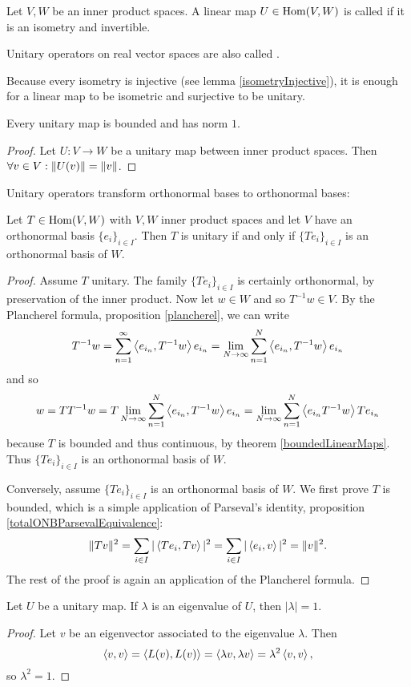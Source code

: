 \begin{definition}
Let $V,W$ be an inner product spaces. A linear map $U\in\operatorname{Hom}(V,W)$ is called  if it is an isometry and invertible.

Unitary operators on real vector spaces are also called .
\end{definition}
Because every isometry is injective (see lemma \ref{isometryInjective}), it is enough for a linear map to be isometric and surjective to be unitary.

\begin{lemma}
Every unitary map is bounded and has norm $1$.
\end{lemma}
\begin{proof}
Let $U: V\to W$ be a unitary map between inner product spaces. Then $\forall v\in V: \lVert U(v)\rVert = \lVert v\rVert$.
\end{proof}

Unitary operators transform orthonormal bases to orthonormal bases:
\begin{proposition}
Let $T\in \operatorname{Hom}(V,W)$ with $V,W$ inner product spaces and let $V$ have an orthonormal basis $\{e_i\}_{i\in I}$. Then $T$ is unitary \textup{if and only if} $\{Te_i\}_{i\in I}$ is an orthonormal basis of $W$.
\end{proposition}
\begin{proof}
Assume $T$ unitary. The family $\{Te_i\}_{i\in I}$ is certainly orthonormal, by preservation of the inner product. Now let $w\in W$ and so $T^{-1}w\in V$. By the Plancherel formula, proposition \ref{plancherel}, we can write
\[ T^{-1}w = \sum_{n=1}^\infty \left\langle e_{i_n},T^{-1}w \right\rangle e_{i_n} = \lim_{N\to\infty}\sum_{n=1}^N \left\langle e_{i_n},T^{-1}w \right\rangle e_{i_n} \]
and so
\[ w = TT^{-1}w = T\lim_{N\to\infty}\sum_{n=1}^N \left\langle e_{i_n},T^{-1}w \right\rangle e_{i_n} = \lim_{N\to\infty}\sum_{n=1}^N \left\langle e_{i_n}T^{-1}w \right\rangle Te_{i_n} \]
because $T$ is bounded and thus continuous, by theorem \ref{boundedLinearMaps}.
Thus $\{Te_i\}_{i\in I}$ is an orthonormal basis of $W$.

Conversely, assume $\{Te_i\}_{i\in I}$ is an orthonormal basis of $W$. We first prove $T$ is bounded, which is a simple application of Parseval's identity, proposition \ref{totalONBParsevalEquivalence}:
\[ \lVert Tv\rVert^2 = \sum_{i\in I}|\left\langle Te_i,Tv \right\rangle|^2 = \sum_{i\in I}|\left\langle e_i,v \right\rangle|^2 = \lVert v\rVert^2. \]
The rest of the proof is again an application of the Plancherel formula.
\end{proof}

\begin{lemma}
Let $U$ be a unitary map. If $\lambda$ is an eigenvalue of $U$, then $|\lambda| = 1$.
\end{lemma}
\begin{proof}
Let $v$ be an eigenvector associated to the eigenvalue $\lambda$. Then
\[ \left\langle v,v \right\rangle = \left\langle L(v),L(v) \right\rangle = \left\langle \lambda v, \lambda v \right\rangle = \lambda^2\left\langle v,v \right\rangle,  \]
so $\lambda^2 = 1$.
\end{proof}

